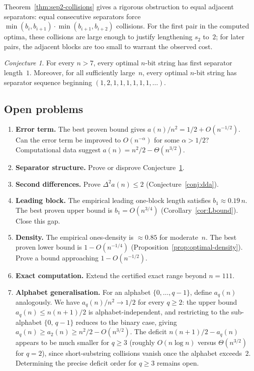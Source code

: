 \documentclass[11pt,a4paper]{article}
\theoremstyle{plain}
\theoremstyle{definition}
\theoremstyle{remark}
\newtheorem{conjecture}[theorem]{Conjecture}
\newcommand{\DDa}{\Delta^2 a}
\begin{document}
Theorem~\ref{thm:sep2-collisions} gives a rigorous obstruction to
equal adjacent separators: equal consecutive separators force
$\min(b_i, b_{i+1}) \cdot \min(b_{i+1}, b_{i+2})$ collisions.
For the first pair in the computed optima, these collisions are large
enough to justify lengthening $s_2$ to~$2$; for later pairs, the
adjacent blocks are too small to warrant the observed cost.

\begin{conjecture}\label{conj:seps}
  For every $n > 7$, every optimal $n$-bit string has first separator
  length~$1$.  Moreover, for all sufficiently large~$n$, every optimal
  $n$-bit string has separator sequence beginning
  $(1, 2, 1, 1, 1, 1, 1, 1, \ldots)$.
\end{conjecture}

\subsection{Open problems}

\begin{enumerate}[label=(\roman*)]
  \item \textbf{Error term.}  The best proven bound gives
    $a(n)/n^2 = 1/2 + O(n^{-1/2})$.  Can the error term be improved
    to $O(n^{-\alpha})$ for some $\alpha > 1/2$?  Computational data
    suggest $a(n) = n^2/2 - \Theta(n^{3/2})$.

  \item \textbf{Separator structure.}  Prove or disprove
    Conjecture~\ref{conj:seps}.

  \item \textbf{Second differences.}  Prove $\DDa(n) \le 2$
    (Conjecture~\ref{conj:dda}).

  \item \textbf{Leading block.}  The empirical leading one-block
    length satisfies $b_1 \approx 0.19\,n$.  The best proven upper
    bound is $b_1 = O(n^{3/4})$
    (Corollary~\ref{cor:Lbound}).  Close this gap.

  \item \textbf{Density.}  The empirical ones-density is
    $\approx 0.85$ for moderate~$n$.  The best proven lower bound is
    $1 - O(n^{-1/4})$ (Proposition~\ref{prop:optimal-density}).
    Prove a bound approaching $1 - O(n^{-1/2})$.

  \item \textbf{Exact computation.}  Extend the certified exact range
    beyond $n = 111$.

  \item \textbf{Alphabet generalisation.}
    For an alphabet $\{0,\ldots,q{-}1\}$, define $a_q(n)$ analogously.
    We have $a_q(n)/n^2 \to 1/2$ for every $q \ge 2$: the upper
    bound $a_q(n) \le n(n{+}1)/2$ is alphabet-independent, and
    restricting to the sub-alphabet $\{0,\,q{-}1\}$ reduces to
    the binary case, giving
    $a_q(n) \ge a_2(n) \ge n^2/2 - O(n^{3/2})$.
    The deficit $n(n{+}1)/2 - a_q(n)$ appears to be much smaller for
    $q \ge 3$ (roughly $O(n \log n)$ versus $\Theta(n^{3/2})$ for
    $q = 2$), since short-substring collisions vanish once the alphabet
    exceeds~$2$.  Determining the precise deficit order for $q \ge 3$
    remains open.
\end{enumerate}
\end{document}
